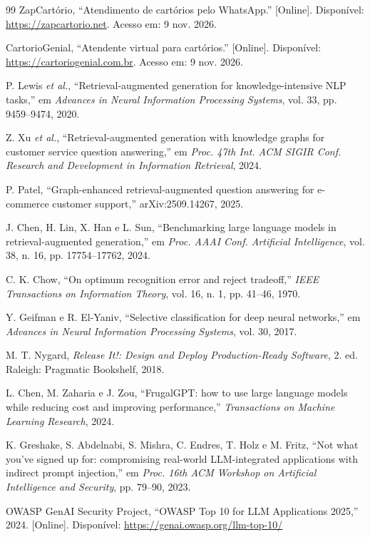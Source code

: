 \documentclass[conference]{IEEEtran}
\begin{document}
\begin{thebibliography}{99}
ZapCartório, ``Atendimento de cartórios pelo WhatsApp.'' [Online]. Disponível: \url{https://zapcartorio.net}. Acesso em: 9 nov. 2026.

CartorioGenial, ``Atendente virtual para cartórios.'' [Online]. Disponível: \url{https://cartoriogenial.com.br}. Acesso em: 9 nov. 2026.

P. Lewis \emph{et al.}, ``Retrieval-augmented generation for knowledge-intensive NLP tasks,'' em \emph{Advances in Neural Information Processing Systems}, vol. 33, pp. 9459--9474, 2020.

Z. Xu \emph{et al.}, ``Retrieval-augmented generation with knowledge graphs for customer service question answering,'' em \emph{Proc. 47th Int. ACM SIGIR Conf. Research and Development in Information Retrieval}, 2024.

P. Patel, ``Graph-enhanced retrieval-augmented question answering for e-commerce customer support,'' arXiv:2509.14267, 2025.

J. Chen, H. Lin, X. Han e L. Sun, ``Benchmarking large language models in retrieval-augmented generation,'' em \emph{Proc. AAAI Conf. Artificial Intelligence}, vol. 38, n. 16, pp. 17754--17762, 2024.

C. K. Chow, ``On optimum recognition error and reject tradeoff,'' \emph{IEEE Transactions on Information Theory}, vol. 16, n. 1, pp. 41--46, 1970.

Y. Geifman e R. El-Yaniv, ``Selective classification for deep neural networks,'' em \emph{Advances in Neural Information Processing Systems}, vol. 30, 2017.

M. T. Nygard, \emph{Release It!: Design and Deploy Production-Ready Software}, 2. ed. Raleigh: Pragmatic Bookshelf, 2018.

L. Chen, M. Zaharia e J. Zou, ``FrugalGPT: how to use large language models while reducing cost and improving performance,'' \emph{Transactions on Machine Learning Research}, 2024.

K. Greshake, S. Abdelnabi, S. Mishra, C. Endres, T. Holz e M. Fritz, ``Not what you've signed up for: compromising real-world LLM-integrated applications with indirect prompt injection,'' em \emph{Proc. 16th ACM Workshop on Artificial Intelligence and Security}, pp. 79--90, 2023.

OWASP GenAI Security Project, ``OWASP Top 10 for LLM Applications 2025,'' 2024. [Online]. Disponível: \url{https://genai.owasp.org/llm-top-10/}


\end{thebibliography}
\end{document}
